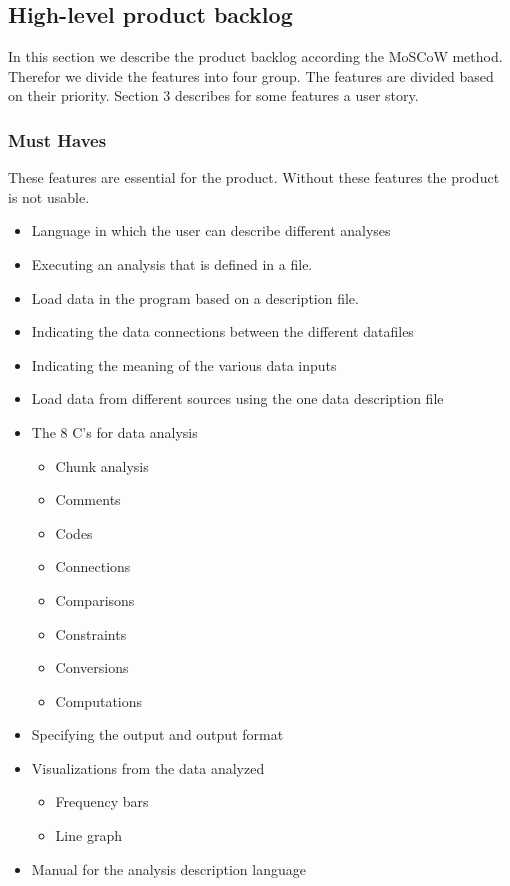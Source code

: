 \subsection{High-level product backlog}
In this section we describe the product backlog according the MoSCoW method. Therefor we divide the features into four group. The features are divided based on their priority. Section 3 describes for some features a user story.
\subsubsection{Must Haves}
These features are essential for the product. Without these features the product is not usable.
\begin{itemize}
  \item Language in which the user can describe different analyses
  \item Executing an analysis that is defined in a file.
  \item Load data in the program based on a description file.
  \item Indicating the data connections between the different datafiles
  \item Indicating the meaning of the various data inputs
  \item Load data from different sources using the one data description file
  \item The 8 C's for data analysis
  \begin{itemize}
    \item Chunk analysis
    \item Comments
    \item Codes 
    \item Connections
    \item Comparisons
    \item Constraints
    \item Conversions
    \item Computations
  \end{itemize}
  \item Specifying the output and output format
  \item Visualizations from the data analyzed
  \begin{itemize}
  	\item Frequency bars
    \item Line graph
  \end{itemize}
  \item Manual for the analysis description language
\end{itemize}

